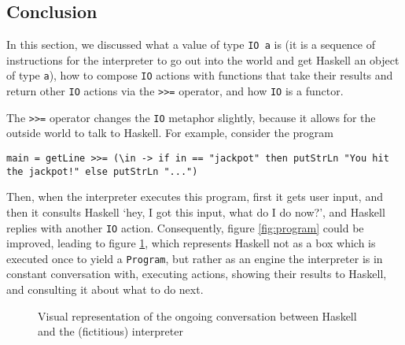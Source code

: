 \documentclass[11pt]{article}
\theoremstyle{nonumberplain}
\newcommand*\lsin{\lstinline}
\begin{document}
\subsection{Conclusion}

In this section, we discussed what a value of type \lsin|IO a| is (it is a sequence of instructions for the interpreter to go out into the world and get Haskell an object of type \lsin|a|), how to compose \lsin|IO| actions with functions that take their results and return other \lsin|IO| actions via the \lsin|>>=| operator, and how \lsin|IO| is a functor.

The \lsin|>>=| operator changes the \lsin|IO| metaphor slightly, because it allows for the outside world to talk to Haskell. For example, consider the program
\begin{lstlisting}
main = getLine >>= (\in -> if in == "jackpot" then putStrLn "You hit the jackpot!" else putStrLn "...")
\end{lstlisting}

Then, when the interpreter executes this program, first it gets user input, and then it consults Haskell `hey, I got this input, what do I do now?', and Haskell replies with another \lsin|IO| action. Consequently, figure \ref{fig:program} could be improved, leading to figure \ref{fig:program2}, which represents Haskell not as a box which is executed once to yield a \lsin|Program|, but rather as an engine the interpreter is in constant conversation with, executing actions, showing their results to Haskell, and consulting it about what to do next.
\begin{figure}
\centering
{}
\caption{Visual representation of the ongoing conversation between Haskell and the (fictitious) interpreter}\label{fig:program2}
\end{figure}
\end{document}
